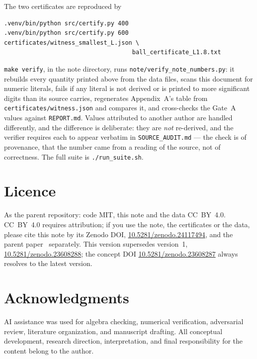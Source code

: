 \documentclass[11pt,a4paper]{article}
\theoremstyle{definition}
\theoremstyle{remark}
\newcommand{\src}[1]{{\footnotesize\texttt{#1}}}
\newcommand{\thisdoi}{10.5281/zenodo.24117494}
\newcommand{\priordoi}{10.5281/zenodo.23608288}
\newcommand{\conceptdoi}{10.5281/zenodo.23608287}
\begin{document}
\noindent The two certificates are reproduced by
\begin{verbatim}
.venv/bin/python src/certify.py 400
.venv/bin/python src/certify.py 600 certificates/witness_smallest_L.json \
                                    ball_certificate_L1.8.txt
\end{verbatim}

\noindent \texttt{make verify}, in the note directory, runs
\src{note/verify\_note\_numbers.py}: it rebuilds every quantity printed above from the
data files, scans this document for numeric literals, fails if any literal is not derived
or is printed to more significant digits than its source carries, regenerates
Appendix~A's table from \src{certificates/witness.json} and compares it, and cross-checks
the Gate~A values against \src{REPORT.md}. Values attributed to another author are
handled differently, and the difference is deliberate: they are \emph{not} re-derived,
and the verifier requires each to appear verbatim in \src{SOURCE\_AUDIT.md} --- the
check is of provenance, that the number came from a reading of the source, not of
correctness. The full suite is \src{./run\_suite.sh}.

\section*{Licence}

As the parent repository: code MIT, this note and the data CC~BY~4.0. CC~BY~4.0 requires
attribution; if you use the note, the certificates or the data, please cite this note by
its Zenodo DOI, \href{https://doi.org/\thisdoi}{\thisdoi}, and the parent
paper~\cite{DeJesus} separately. This version supersedes version~1,
\href{https://doi.org/\priordoi}{\priordoi}; the concept DOI
\href{https://doi.org/\conceptdoi}{\conceptdoi} always resolves to the latest version.

\section*{Acknowledgments}

AI assistance was used for algebra checking, numerical verification, adversarial review,
literature organization, and manuscript drafting. All conceptual development, research
direction, interpretation, and final responsibility for the content belong to the author.
\end{document}
